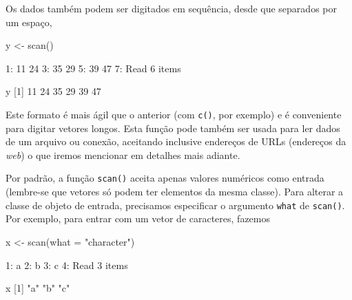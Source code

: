 \documentclass[
  10pt,
  a4paper]{book}
\newenvironment{Shaded}{\begin{snugshade}}{\end{snugshade}}
\newcommand{\AttributeTok}[1]{\textcolor[rgb]{0.77,0.63,0.00}{#1}}
\newcommand{\DecValTok}[1]{\textcolor[rgb]{0.00,0.00,0.81}{#1}}
\newcommand{\FunctionTok}[1]{\textcolor[rgb]{0.00,0.00,0.00}{#1}}
\newcommand{\NormalTok}[1]{#1}
\newcommand{\OtherTok}[1]{\textcolor[rgb]{0.56,0.35,0.01}{#1}}
\newcommand{\SpecialCharTok}[1]{\textcolor[rgb]{0.00,0.00,0.00}{#1}}
\newcommand{\StringTok}[1]{\textcolor[rgb]{0.31,0.60,0.02}{#1}}
\begin{document}
Os dados também podem ser digitados em sequência, desde que separados
por um espaço,

\begin{Shaded}
\begin{Highlighting}[]
\NormalTok{y }\OtherTok{\textless{}{-}} \FunctionTok{scan}\NormalTok{()}

\DecValTok{1}\SpecialCharTok{:} \DecValTok{11} \DecValTok{24}
\DecValTok{3}\SpecialCharTok{:} \DecValTok{35} \DecValTok{29}
\DecValTok{5}\SpecialCharTok{:} \DecValTok{39} \DecValTok{47}
\DecValTok{7}\SpecialCharTok{:}
\NormalTok{Read }\DecValTok{6}\NormalTok{ items}
\end{Highlighting}
\end{Shaded}

\begin{Shaded}
\begin{Highlighting}[]
\NormalTok{y}
\NormalTok{[}\DecValTok{1}\NormalTok{] }\DecValTok{11} \DecValTok{24} \DecValTok{35} \DecValTok{29} \DecValTok{39} \DecValTok{47}
\end{Highlighting}
\end{Shaded}

Este formato é mais ágil que o anterior (com \texttt{c()}, por exemplo) e é
conveniente para digitar vetores longos. Esta função pode também ser
usada para ler dados de um arquivo ou conexão, aceitando inclusive
endereços de URLs (endereços da \emph{web}) o que iremos mencionar em
detalhes mais adiante.

Por padrão, a função \texttt{scan()} aceita apenas valores numéricos como
entrada (lembre-se que vetores só podem ter elementos da mesma
classe). Para alterar a classe de objeto de entrada, precisamos
especificar o argumento \texttt{what} de \texttt{scan()}. Por exemplo, para entrar com
um vetor de caracteres, fazemos

\begin{Shaded}
\begin{Highlighting}[]
\NormalTok{x }\OtherTok{\textless{}{-}} \FunctionTok{scan}\NormalTok{(}\AttributeTok{what =} \StringTok{"character"}\NormalTok{)}

\DecValTok{1}\SpecialCharTok{:}\NormalTok{ a}
\DecValTok{2}\SpecialCharTok{:}\NormalTok{ b}
\DecValTok{3}\SpecialCharTok{:}\NormalTok{ c}
\DecValTok{4}\SpecialCharTok{:}
\NormalTok{Read }\DecValTok{3}\NormalTok{ items}
\end{Highlighting}
\end{Shaded}

\begin{Shaded}
\begin{Highlighting}[]
\NormalTok{x}
\NormalTok{[}\DecValTok{1}\NormalTok{] }\StringTok{"a"} \StringTok{"b"} \StringTok{"c"}
\end{Highlighting}
\end{Shaded}
\end{document}
